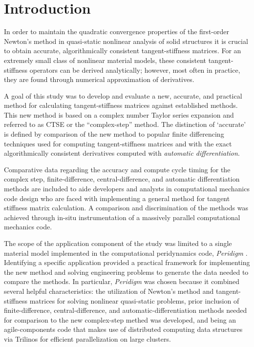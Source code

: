 \documentclass[preprint,12pt]{elsarticle}
\begin{document}



\section{Introduction}
\label{sec:intro} 

In order to maintain the quadratic convergence properties of the first-order Newton's method in quasi-static nonlinear analysis of solid structures it is crucial to obtain accurate, algorithmically consistent tangent-stiffness matrices. For an extremely small class of nonlinear material models, these consistent tangent-stiffness operators can be derived analytically; however, most often in practice, they are found through numerical approximation of derivatives. 

A goal of this study was to develop and evaluate a new, accurate, and practical method for calculating tangent-stiffness matrices against established methods.  This new method is based on a complex number Taylor series expansion and referred to as CTSE or the ``complex-step'' method.  The
distinction of `accurate' is defined by comparison of the new method to popular finite differencing techniques used for computing tangent-stiffness matrices and with the exact algorithmically consistent derivatives computed with \emph{automatic differentiation}.

Comparative data regarding the accuracy and compute cycle timing for the complex step, finite-difference, central-difference, and automatic differentiation methods are included to aide developers and analysts in computational mechanics code design who are faced with implementing a general method for tangent stiffness matrix calculation.  A comparison and discrimination of the methods was achieved through in-situ instrumentation of a massively parallel computational mechanics code.   

The scope of the application component of the study was limited to a single material model implemented in the computational peridynamics code, \textit{Peridigm} \cite{peridigm}. Identifying a specific application provided a practical framework for implementing the new method and solving engineering problems to generate the data needed to compare the methods. In particular, \emph{Peridigm} was chosen because it combined several helpful characteristics: the utilization of Newton's method and tangent-stiffness matrices for solving nonlinear quasi-static problems, prior inclusion of finite-difference, central-difference, and automatic-differentiation methods needed for comparison to the new complex-step methed was developed, and being an agile-components code that makes use of distributed computing data structures via Trilinos \cite{trilinos} for efficient parallelization on large clusters.
\end{document}

